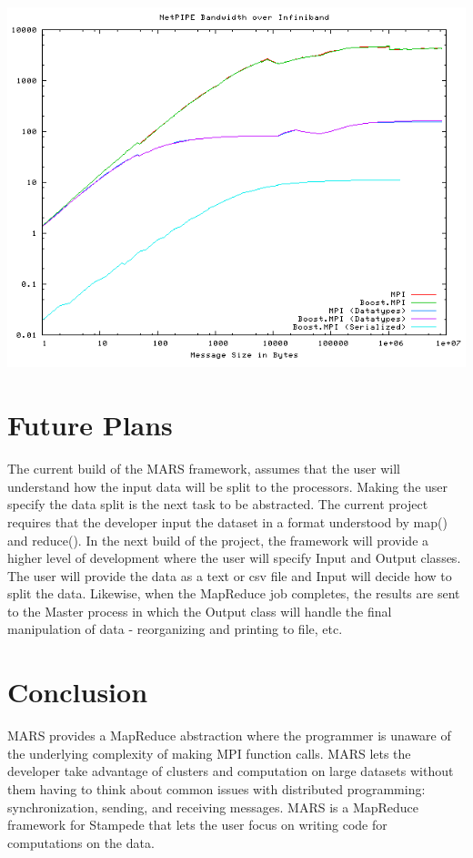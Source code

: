 \documentclass[11pt]{article}
\begin{document}
\hspace{-.2em}\includegraphics[scale=0.6]{boost_performance}

\section{Future Plans}
The current build of the MARS framework, assumes that the user will understand how the input data will be split to the processors. Making the user specify the data split is the next task to be abstracted. The current project requires that the developer input the dataset in a format understood by map() and reduce(). In the next build of the project, the framework will provide a higher level of development where the user will specify Input and Output classes. The user will provide the data as a text or csv file and Input will decide how to split the data. Likewise, when the MapReduce job completes, the results are sent to the Master process in which the Output class will handle the final manipulation of data - reorganizing and printing to file, etc.

\section{Conclusion}
MARS provides a MapReduce abstraction where the programmer is unaware of the underlying complexity of making MPI function calls. MARS lets the developer take advantage of clusters and computation on large datasets without them having to think about common issues with distributed programming: synchronization, sending, and receiving messages. MARS is a MapReduce framework for Stampede that lets the user focus on writing code for computations on the data.
\end{document}
